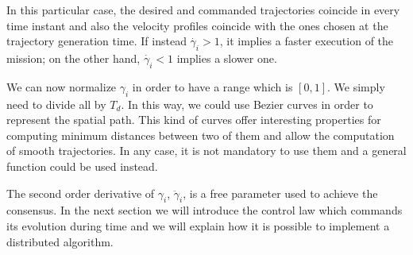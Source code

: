 In this particular case, the desired and commanded trajectories coincide
in every time instant and also the velocity profiles coincide with the ones
chosen at the trajectory generation time.
If instead $\dot{\gamma_i} > 1$, it implies a faster execution of the mission;
on the other hand, $\dot{\gamma_i} < 1$ implies a slower one.

We can now normalize $\gamma_i$ in order to have a range which is $[0,1]$. We simply
need to divide all by $T_d$. In this way, we could use Bezier curves in order to
represent the spatial path. This kind of curves offer interesting properties for
computing minimum distances between two of them and allow the computation of
smooth trajectories. In any case, it is not mandatory to use them and a general
function could be used instead.

The second order derivative of $\gamma_i$, $\ddot{\gamma}_i$, is a free parameter
used to achieve the consensus. In the next section we will introduce the control law
which commands its evolution during time and we will explain how it is possible to
implement a distributed algorithm.

